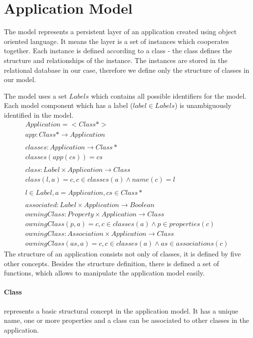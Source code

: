 \documentclass[11pt]{article}
\begin{document}
\section{Application Model}
\label{sec:appModel}
The model represents a persistent layer of an application created using object oriented language. It means the layer is a set of instances which cooperates together. Each instance is defined according to a class - the class defines the structure and relationships of the instance. The instances are stored in the relational database in our case, therefore we define only the structure of classes in our model. 

The model uses a set $Labels$ which contains all possible identifiers for the model. Each model component which has a label ($label \in Labels$) is unambiguously identified in the model.
\begin{gather*}
  Application = < Class* >
  \\ 
  app : Class* \rightarrow  Application \\ \\
  classes : Application \rightarrow Class* \\
  classes(app(cs)) = cs  \\\\
  class : Label \times Application \rightarrow Class   \\ 
  class(l, a) = c, c \in classes(a) \wedge name(c) = l \\ \\
  l \in Label, a = Application, cs \in Class* 
  \\ \\
  associated :  Label \times Application \rightarrow Boolean \\
  owningClass : Property \times Application \rightarrow Class  \\ owningClass(p, a) = c, c \in classes(a) \wedge p \in properties(c) \\
  owningClass : Association \times Application \rightarrow Class  \\
owningClass(as, a) = c, c \in classes(a) \wedge as \in associations(c)
\end{gather*}
The structure of an application consists not only of classes, it is defined by five other concepts. Besides the structure definition, there is defined a set of functions, which allows to manipulate the application model easily. 

\paragraph{Class} represents a basic structural concept in the application model. It has a unique name, one or more properties and a class can be associated to other classes in the application. 
\end{document}
